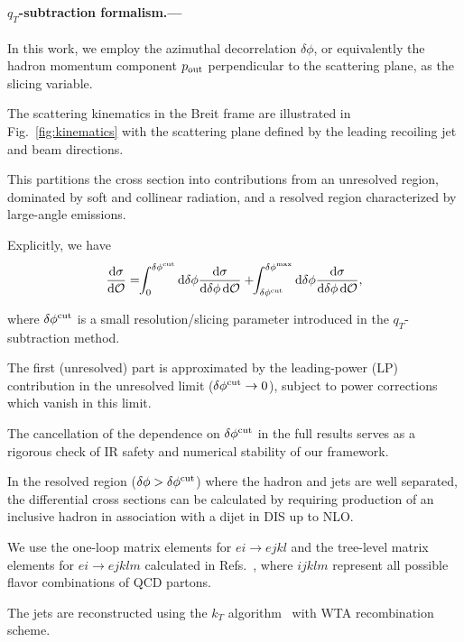 \documentclass[prl,aps,twocolumn,superscriptaddress]{revtex4}
\def\d{{\rm d}}
\begin{document}
\
\paragraph*{$q_T$-subtraction formalism.---}

In this work, we employ the azimuthal decorrelation $\delta\phi$, or equivalently the hadron momentum component $p_{\rm out}$ perpendicular to the scattering plane, as the slicing variable.

The scattering kinematics in the Breit frame are illustrated in Fig.~\ref{fig:kinematics} with the scattering plane defined by the leading recoiling jet and beam directions.

This partitions the cross section into contributions from an unresolved region, dominated by soft and collinear radiation, and a resolved region characterized by large-angle emissions.

Explicitly, we have
\begin{align}
 {\d\sigma\over \d\mathcal O}= \!\!\int_0^{\delta \phi^{\rm cut}}\d \delta\phi \frac{\d\sigma}{\d\delta \phi\,\d\mathcal O} +\!\!\int_{\delta \phi^{\rm cut}}^{\delta \phi^{\rm max}} \d \delta\phi \frac{\d\sigma}{ \d\delta \phi\,\d\mathcal O},
\end{align}

where $\delta \phi^{\rm cut}$ is a small resolution/slicing parameter introduced in the $q_T$-subtraction method.

The first (unresolved) part is approximated by the leading-power (LP) contribution in the unresolved limit ($\delta\phi^{\rm cut}\to0$), subject to power corrections which vanish in this limit.

The cancellation of the dependence on $\delta\phi^{\rm cut}$ in the full results serves as a rigorous check of IR safety and numerical stability of our framework.




In the resolved region ($\delta\phi > \delta \phi^{\rm cut}$) where the hadron and jets are well separated, the differential cross sections can be calculated by requiring production of an inclusive hadron in association with a dijet in DIS up to NLO.

We use the one-loop matrix elements for $ei \to ejkl$ and the tree-level matrix elements for $ei \to ejklm$ calculated in Refs.~\cite{Bern:1997sc, Campbell:2002tg, Campbell:2003hd, Campbell:2010ff}, where $ijklm$ represent all possible flavor combinations of QCD partons.

The jets are reconstructed using the $k_T$ algorithm~\cite{Catani:1993hr, Ellis:1993tq} with WTA recombination scheme.
\end{document}
